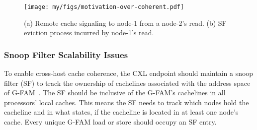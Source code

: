 









\begin{figure}[t]
  \centering 
  \texttt{[image: my/figs/motivation-over-coherent.pdf]}
  \caption{(a) Remote cache signaling to node-1 from a node-2's read. (b) SF eviction process incurred by node-1's read. }
  \label{fig:motivation-over-coherent}
\end{figure}

\subsubsection{Snoop Filter Scalability Issues}    \label{subsec:snoop_filter}


To enable cross-host cache coherence, the CXL endpoint should maintain a snoop filter (SF) to track the ownership of cachelines associated with the address space of G-FAM~\cite{directory_sp19, moesi_isca22, skylake_sf_doc}. The SF should be inclusive of the G-FAM's cachelines in all processors' local caches. This means the SF needs to track which nodes hold the cacheline and in what states, if the cacheline is located in at least one node's cache. Every unique G-FAM load or store should occupy an SF entry.


